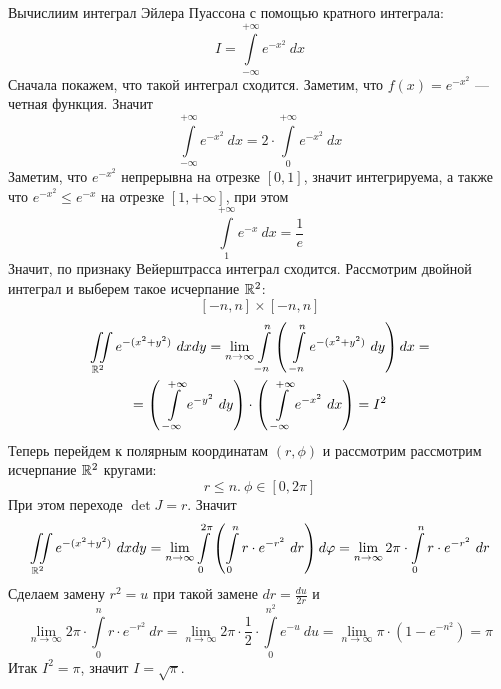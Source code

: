 \begin{example}
    Вычислиим интеграл Эйлера Пуассона с помощью кратного интеграла:
    \[I=\int\limits_{-\infty}^{+\infty}e^{-x^2}\ dx\]
    Сначала покажем, что такой интеграл сходится. Заметим, что $f(x)=e^{-x^2}$ --- четная функция. Значит
    \[\int\limits_{-\infty}^{+\infty}e^{-x^2}\ dx=2\cdot\int\limits_{0}^{+\infty}e^{-x^2}\ dx\]
    Заметим, что $e^{-x^2}$ непрерывна на отрезке $[0,1]$, значит интегрируема, а также что $e^{-x^2}\leq e^{-x}$ на отрезке $[1,+\infty]$, при этом
    \[\int\limits_{1}^{+\infty}e^{-x}\ dx=\frac{1}{e}\]
    Значит, по признаку Вейерштрасса интеграл сходится. Рассмотрим двойной интеграл и выберем такое исчерпание $\mathbb{R}^2$:
    \[[-n,n]\times[-n,n]\]
    \begin{multline*}
        \iint\limits_{\R^2}e^{-(x^2+y^2)}\ dxdy=\lim\limits_{n\to \infty}\int\limits_{-n}^{n}\left(\ \int\limits_{-n}^{n}e^{-(x^2+y^2)}\ dy\right)dx=\\
        =\left(\ \int\limits_{-\infty}^{+\infty} e^{-y^2}\ dy\right)\cdot \left(\ \int\limits_{-\infty}^{+\infty}e^{-x^2}\ dx\right)=I^2
    \end{multline*}
    Теперь перейдем к полярным координатам $(r,\phi)$ и рассмотрим рассмотрим исчерпание $\mathbb{R}^2$ кругами: 
    \[r\leq n.\ \phi\in [0,2\pi]\]
    При этом переходе $\det{J}=r$. Значит
    \[\iint\limits_{\R^2}e^{-(x^2+y^2)}\ dxdy=\lim\limits_{n\to \infty}\int\limits_{0}^{2\pi}\left(\int\limits_{0}^{n}r\cdot e^{-r^2}\ dr\right)d\phi=\lim\limits_{n\to \infty}2\pi\cdot \int\limits_{0}^{n}r\cdot e^{-r^2}\ dr\]
    Сделаем замену $r^2=u$ при такой замене $dr=\frac{du}{2r}$ и
    \[\lim\limits_{n\to \infty}2\pi\cdot \int\limits_{0}^{n}r\cdot e^{-r^2}\ dr=\lim\limits_{n\to \infty}2\pi\cdot \frac{1}{2}\cdot \int\limits_{0}^{n^2}e^{-u}\ du=\lim\limits_{n\to \infty}\pi\cdot(1- e^{-n^2})=\pi\]
    Итак $I^2=\pi$, значит $I=\sqrt{\pi}$.
\end{example}
\newpage
